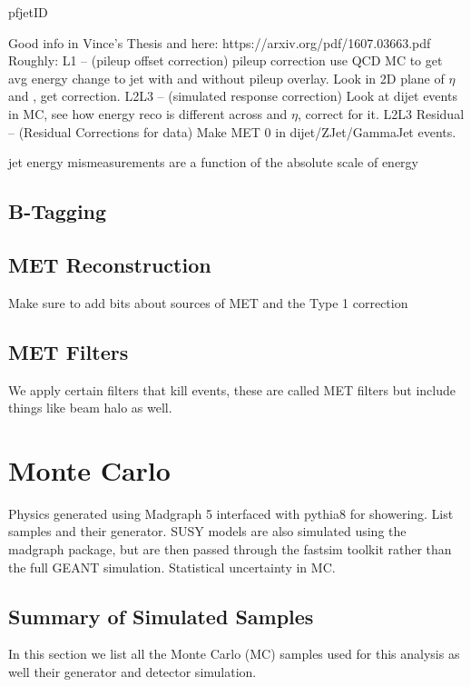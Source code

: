     pfjetID

    Good info in Vince's Thesis and here: https://arxiv.org/pdf/1607.03663.pdf
    Roughly: L1 -- (pileup offset correction) pileup correction use QCD MC to get avg energy change to jet with and without pileup overlay. Look in 2D plane of $\eta$ and \pt, get correction.
    L2L3 -- (simulated response correction) Look at dijet events in MC, see how energy reco is different across \pt and $\eta$, correct for it.
    L2L3 Residual -- (Residual Corrections for data) Make MET 0 in dijet/ZJet/GammaJet events.

    jet energy mismeasurements are a function of the absolute scale of energy
  \subsection{B-Tagging} \label{sec:b-tagging}

  \subsection{MET Reconstruction} \label{sec:MET_reco}
    Make sure to add bits about sources of MET and the Type 1 correction
  \subsection{MET Filters} \label{sec:met_filters} 
    We apply certain filters that kill events, these are called MET filters but include things like beam halo as well.

\section{Monte Carlo} \label{sec:monte_carlo}
  Physics generated using Madgraph 5 interfaced with pythia8 for showering. List samples and their generator.
  SUSY models are also simulated using the madgraph package, but are then passed through the fastsim toolkit \cite{fastsim} rather than the full GEANT simulation. Statistical uncertainty in MC.
  \subsection{Summary of Simulated Samples} \label{sec:summary_of_simulated_samples}
    
    In this section we list all the Monte Carlo (MC) samples used for this analysis as well their generator and detector simulation.

